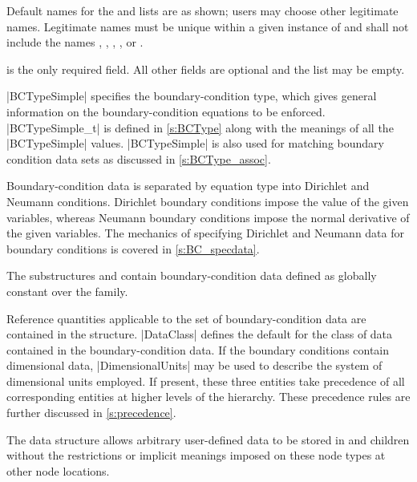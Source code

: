 \begin{notes}
\item Default names for the  and
       lists are as shown; users may choose other
      legitimate names.
      Legitimate names must be unique within a given instance
      of  and shall not include the names
      ,
      , , ,
       or .
\item {} is the only required field.
      All other fields are optional and the  list
      may be empty.
\end{notes}

|BCTypeSimple| specifies the boundary-condition type, which gives general
information on the bound\-ary-con\-di\-tion equations to be enforced.
|BCTypeSimple_t| is defined in \autoref{s:BCType} along with the meanings
of all the |BCTypeSimple| values.
|BCTypeSimple| is also used for matching boundary condition data sets as
discussed in \autoref{s:BCType_assoc}.

Boundary-condition data is separated by equation type into Dirichlet
and Neumann conditions.  Dirichlet boundary conditions impose the
value of the given variables, whereas Neumann boundary conditions
impose the normal derivative of the given variables.  The mechanics of
specifying Dirichlet and Neumann data for boundary conditions is covered
in \autoref{s:BC_specdata}.

The substructures  and  contain
boundary-condition data defined as globally constant over the family.

Reference quantities applicable to the set of boundary-condition data are
contained in the  structure.
|DataClass| defines the default for the class of data contained in the
boundary-condition data.
If the boundary conditions contain dimensional data, |DimensionalUnits|
may be used to describe the system of dimensional units employed.
If present, these three entities take precedence of all corresponding
entities at higher levels of the hierarchy.
These precedence rules are further discussed in \autoref{s:precedence}.

The  data structure allows arbitrary
user-defined data to be stored in  and
 children without the restrictions or implicit
meanings imposed on these node types at other node locations.

